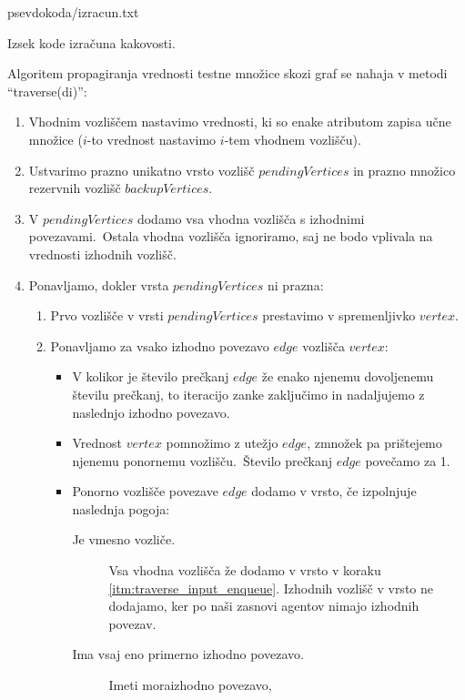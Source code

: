 \documentclass[a4paper,12pt,openright]{book}
\newcommand{\lstlistingslo}{}
\begin{document}
    \begin{algorithm}[!htb]
        \lstlistingslo{psevdokoda/izracun.txt}
        \caption{Izsek kode izračuna kakovosti.}
        \label{alg:izracun_kakovosti}
    \end{algorithm}

    Algoritem propagiranja vrednosti testne množice skozi graf se nahaja v metodi \enquote{traverse(di)}:
    \begin{enumerate}
        \item Vhodnim vozliščem nastavimo vrednosti, ki so enake atributom zapisa učne množice ($i$-to vrednost nastavimo $i$-tem vhodnem vozlišču).
        \item Ustvarimo prazno unikatno vrsto vozlišč $pendingVertices$ in prazno množico rezervnih vozlišč $backupVertices$.
        \item \label{itm:traverse_input_enqueue} V $pendingVertices$ dodamo vsa vhodna vozlišča s izhodnimi povezavami.\ Ostala vhodna vozlišča
        ignoriramo, saj ne bodo vplivala na vrednosti izhodnih vozlišč.
        \item \label{itm:traverse_pending_loop} Ponavljamo, dokler vrsta $pendingVertices$ ni prazna:
        \begin{enumerate}
            \item Prvo vozlišče v vrsti $pendingVertices$ prestavimo v spremenljivko $vertex$.
            \item Ponavljamo za vsako izhodno povezavo $edge$ vozlišča $vertex$:
            \begin{itemize}
                \item V kolikor je število prečkanj $edge$ že enako njenemu dovoljenemu številu prečkanj,
                to iteracijo zanke zaključimo in nadaljujemo z naslednjo izhodno povezavo.
                \item Vrednost $vertex$ pomnožimo z utežjo $edge$, zmnožek pa pri\-šte\-je\-mo njenemu ponornemu vozlišču.\ Število prečkanj $edge$ povečamo za 1.
                \item Ponorno vozlišče povezave $edge$ dodamo v vrsto, če izpolnjuje naslednja pogoja:
                \begin{description}
                    \item[Je vmesno vozliče.]{Vsa vhodna vozlišča že dodamo v vrsto v koraku \ref{itm:traverse_input_enqueue}. Izhodnih vozlišč v vrsto
                    ne dodajamo, ker po naši zasnovi agentov nimajo izhodnih povezav.}
                    \item[Ima vsaj eno primerno izhodno povezavo.]{Imeti mora\linebreak izhodno povezavo,
}
\end{description}
\end{itemize}
\end{enumerate}
\end{enumerate}
\end{document}

